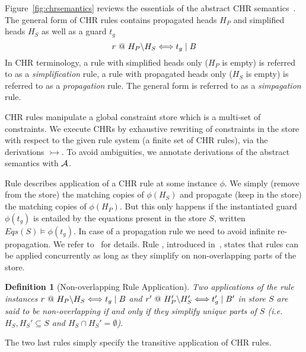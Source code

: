 \documentclass{tlp}
\newtheorem{definition}{Definition}[section]
\begin{document}
Figure~\ref{fig:chrsemantics} reviews the essentials of the abstract CHR 
semantics~\cite{fruehwirth98:chr:art}. The general form of CHR rules contains propagated 
heads $H_P$ and simplified heads $H_S$ as well as a guard $t_g$
$$
r~@ ~H_P \backslash H_S \Longleftrightarrow t_g \mid B
$$
In CHR terminology, a rule with simplified heads only ($H_P$ is empty) is referred to as
a {\em simplification} rule, a rule with propagated heads only ($H_S$ is empty) is referred to as
a {\em propagation} rule. The general form is referred to as a {\em simpagation} rule.

CHR rules manipulate a global constraint store which is a multi-set of constraints.
We execute CHRs by exhaustive rewriting of constraints in the store
with respect to the given rule system (a finite set of CHR rules), via the derivations
$\rightarrowtail$. To avoid ambiguities, we annotate derivations  of the abstract 
semantics with ${\cal A}$.

Rule  describes application of a CHR rule  at some instance $\phi$.
We simply (remove from the store)  the matching copies of $\phi(H_S)$ 
and propagate (keep in the store) the matching copies of $\phi(H_P)$.
But this only happens if the instantiated guard $\phi(t_g)$ is entailed by the equations 
present in the store $S$, written $Eqs(S) \models \phi(t_g)$.
In case of a propagation rule we need to avoid infinite re-propagation. We refer 
to~\cite{abdennadher:confluence,greg:thesis} for details. 
Rule , introduced in~\cite{union-find}, states that rules can be 
applied concurrently as long as they 
simplify on non-overlapping parts of the store.
\begin{definition} 
   [Non-overlapping Rule Application] \label{def:nonoverlap-rule}
   Two applications of the rule instances
   $r~@~H_P \backslash H_S \Longleftrightarrow t_g \mid B$ and 
   $r'~@~H_P' \backslash H_S' \Longleftrightarrow t_g' \mid B'$ in store $S$ are said to 
   be non-overlapping if and only if they simplify unique parts of $S$ 
   (i.e. $H_S,H_S' \subseteq S$ and $H_S \cap H_S' = \emptyset$).
\end{definition}
The two last  rules simply specify the transitive application of CHR rules.

\end{document}
